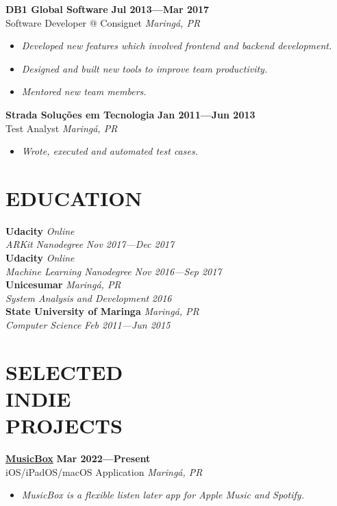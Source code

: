 \documentclass[line,margin]{res}
\begin{document}
\begin{resume}
  {\bf DB1 Global Software} \hfill {\bf Jul 2013---Mar 2017} \\
  Software Developer @ Consignet \hfill {\sl Maring\'a, PR}\\[-6pt]
  \begin{itemize}
    \item {\sl Developed new features which involved
               frontend and backend development.}
    \item {\sl Designed and built new tools to improve team productivity.}
    \item {\sl Mentored new team members.}
  \end{itemize}

  {\bf Strada Solu\c{c}\~oes em Tecnologia} \hfill {\bf Jan 2011---Jun 2013} \\
  Test Analyst \hfill {\sl Maring\'a, PR}\\[-6pt]
    \begin{itemize}
    \item {\sl Wrote, executed and automated test cases.}
  \end{itemize}


\section{EDUCATION}
  {\bf Udacity} \hfill {\sl Online} \\
  {\sl ARKit Nanodegree} \hfill {\sl Nov 2017---Dec 2017}\\[6pt]
  {\bf Udacity} \hfill {\sl Online} \\
  {\sl Machine Learning Nanodegree} \hfill {\sl Nov 2016---Sep 2017}\\[6pt]
  {\bf Unicesumar} \hfill {\sl Maring\'a, PR} \\
  {\sl System Analysis and Development} \hfill {\sl 2016}\\[6pt]
  {\bf State University of Maringa} \hfill {\sl Maring\'a, PR} \\
  {\sl Computer Science} \hfill {\sl Feb 2011---Jun 2015}


\section{SELECTED \\ INDIE \\ PROJECTS}
  {\bf \href{https://apps.apple.com/us/app/id1614730313}{MusicBox}} \hfill {\bf Mar 2022---Present} \\
  iOS/iPadOS/macOS Application \hfill {\sl Maring\'a, PR}\\[-6pt]
    \begin{itemize}
    \item {\sl MusicBox is a flexible listen later app for Apple Music and Spotify.}
    \end{itemize}


\end{resume}
\end{document}
